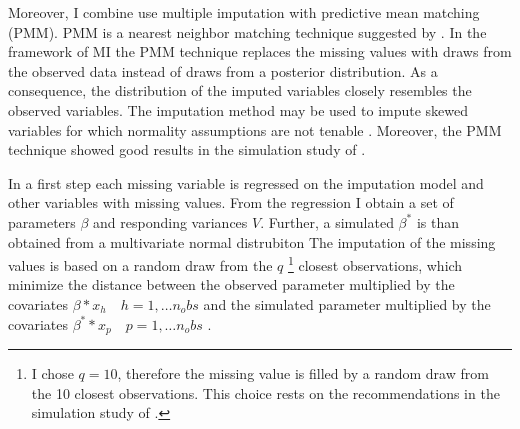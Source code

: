  Moreover, I combine use multiple imputation with predictive mean matching (PMM).
 PMM  is a nearest neighbor matching technique suggested by \textcite{Rubin_matching}.
In the framework of MI the PMM technique replaces the missing values with draws from the observed data instead of draws from a posterior distribution.
As a consequence, the distribution of the imputed variables closely resembles the observed variables.
The imputation method may be used to impute skewed variables for which normality assumptions are not tenable \parencite{White_MI_chained}.
Moreover, the PMM technique showed good results in the simulation study of \textcite{Morris2014}.   \par
In a first step each missing variable is regressed on the imputation model and other variables with missing values.
From the regression I obtain a set of parameters $\beta$ and responding variances $V$. Further, a simulated $\beta^*$ is than obtained from a multivariate normal distrubiton
The imputation of the missing values is based on a random draw  from the $q$ \footnote{I chose $q= 10$, therefore the missing value is filled by a random draw from the 10 closest observations.
 This choice rests on the recommendations in the simulation study of \textcite{Morris2014}.} closest  observations, which minimize the distance between the observed parameter multiplied by the covariates $\beta * x_h \quad h=1, \dots n_obs$  and the simulated parameter multiplied by the covariates  $\beta^* * x_p \quad p=1, \dots n_obs$ .
